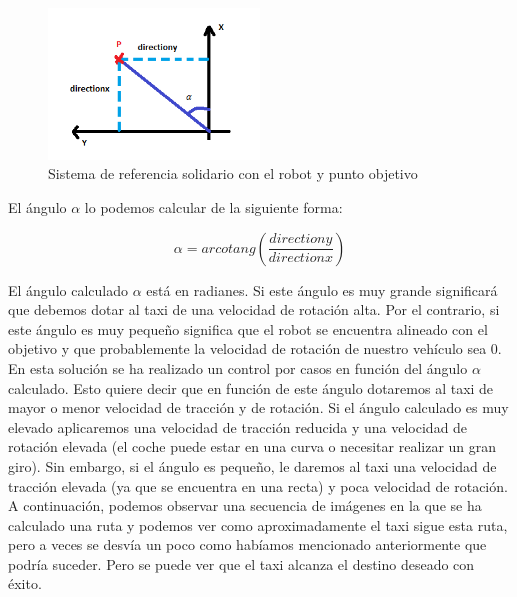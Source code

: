 \begin{figure}[H]
  \begin{center}
    \includegraphics[width=0.5\textwidth]{figures/GPP/Triangulo.png}
		\caption{Sistema de referencia solidario con el robot y punto objetivo}
		\label{fig.Triangulo_gpp}
		\end{center}
\end{figure}

El ángulo \(\alpha\) lo podemos calcular de la siguiente forma:

\begin{equation} 
\alpha = arcotang\left(\frac{directiony}{directionx}\right)
\end{equation}

El ángulo calculado \(\alpha\) está en radianes. Si este ángulo es muy grande significará que debemos dotar al taxi de una velocidad de rotación alta. Por el contrario, si este ángulo es muy pequeño significa que el robot se encuentra alineado con el objetivo y que probablemente la velocidad de rotación de nuestro vehículo sea 0.\\

En esta solución se ha realizado un control por casos en función del ángulo \(\alpha\)  calculado. Esto quiere decir que en función de este ángulo dotaremos al taxi de mayor o menor velocidad de tracción y de rotación. Si el ángulo calculado es muy elevado aplicaremos una velocidad de tracción reducida y una velocidad de rotación elevada (el coche puede estar en una curva o necesitar realizar un gran giro). Sin embargo, si el ángulo es pequeño, le daremos al taxi una velocidad de tracción elevada (ya que se encuentra en una recta) y poca velocidad de rotación.\\

A continuación, podemos observar una secuencia de imágenes en la que se ha calculado una ruta y podemos ver como aproximadamente el taxi sigue esta ruta, pero a veces se desvía un poco como habíamos mencionado anteriormente que podría suceder. Pero se puede ver que el taxi alcanza el destino deseado con éxito.

